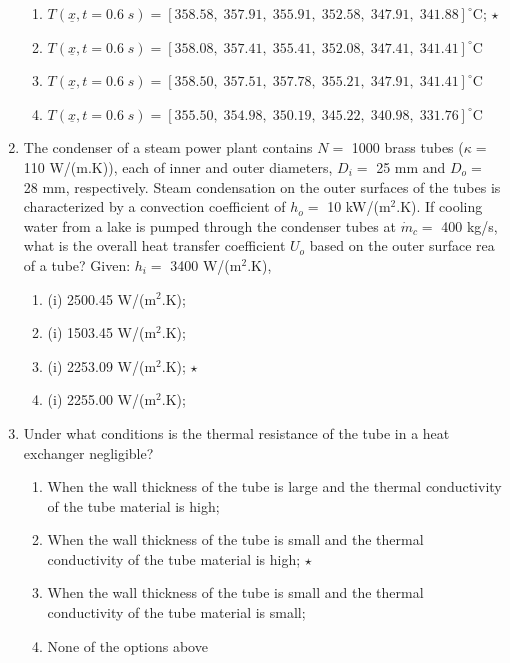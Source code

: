 \documentclass[12pts,a4paper,amsmath,amssymb,floatfix]{article}%
\begin{document}
\begin{enumerate}
\begin{enumerate}
   \item $T\left(\underline{x},t=0.6\;s\right)= \left[ 358.58,\; 357.91,\; 355.91,\; 352.58,\; 347.91,\; 341.88\right]^{\circ}$C; $\star$
   \item $T\left(\underline{x},t=0.6\;s\right)= \left[ 358.08,\; 357.41,\; 355.41,\; 352.08,\; 347.41,\; 341.41\right]^{\circ}$C
   \item $T\left(\underline{x},t=0.6\;s\right)= \left[ 358.50,\; 357.51,\; 357.78,\; 355.21,\; 347.91,\; 341.41\right]^{\circ}$C
   \item $T\left(\underline{x},t=0.6\;s\right)= \left[ 355.50,\; 354.98,\; 350.19,\; 345.22,\; 340.98,\; 331.76\right]^{\circ}$C
\end{enumerate}
%
\item The condenser of a steam power plant contains $N=$ 1000 brass tubes ($\kappa=$ 110 W/(m.K)), each of inner and outer diameters, $D_{i}=$ 25 mm and $D_{o}=$ 28 mm, respectively. Steam condensation on the outer surfaces of the tubes is characterized by a convection coefficient of $h_{o}=$ 10 kW/(m$^{2}$.K). If cooling water from a lake is pumped through the condenser tubes at $\dot{m}_{c}=$ 400 kg/s, what is the overall heat transfer coefficient $U_{o}$ based on the outer surface rea of a tube?  Given: $h_{i}=$ 3400 W/(m$^{2}$.K), %
\begin{enumerate}
 \item (i) 2500.45 W/(m$^{2}$.K);
 \item (i) 1503.45 W/(m$^{2}$.K);
 \item (i) 2253.09 W/(m$^{2}$.K); $\star$ 
 \item (i) 2255.00 W/(m$^{2}$.K);
\end{enumerate}
%
\item Under what conditions is the thermal resistance of the tube in a heat exchanger negligible? %
\begin{enumerate}
 \item When the wall thickness of the tube is large and the thermal conductivity of the tube material is high;
 \item When the wall thickness of the tube is small and the thermal conductivity of the tube material is high; $\star$
 \item When the wall thickness of the tube is small and the thermal conductivity of the tube material is small;
 \item None of the options above
\end{enumerate}

\end{enumerate}
\end{document}
